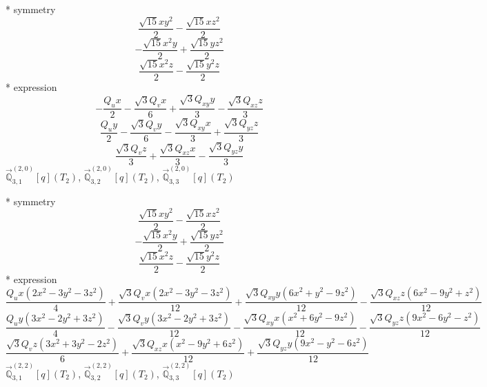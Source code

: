 \documentclass[fleqn,8pt]{jsarticle}
\begin{document}
\noindent\quad ** symmetry
\begin{dmath*}
\frac{\sqrt{15} x y^{2}}{2} - \frac{\sqrt{15} x z^{2}}{2}
\end{dmath*}
\begin{dmath*}
- \frac{\sqrt{15} x^{2} y}{2} + \frac{\sqrt{15} y z^{2}}{2}
\end{dmath*}
\begin{dmath*}
\frac{\sqrt{15} x^{2} z}{2} - \frac{\sqrt{15} y^{2} z}{2}
\end{dmath*}
\noindent\quad ** expression
\begin{dmath*}
- \frac{Q_{u} x}{2} - \frac{\sqrt{3} Q_{v} x}{6} + \frac{\sqrt{3} Q_{xy} y}{3} - \frac{\sqrt{3} Q_{xz} z}{3}
\end{dmath*}
\begin{dmath*}
\frac{Q_{u} y}{2} - \frac{\sqrt{3} Q_{v} y}{6} - \frac{\sqrt{3} Q_{xy} x}{3} + \frac{\sqrt{3} Q_{yz} z}{3}
\end{dmath*}
\begin{dmath*}
\frac{\sqrt{3} Q_{v} z}{3} + \frac{\sqrt{3} Q_{xz} x}{3} - \frac{\sqrt{3} Q_{yz} y}{3}
\end{dmath*}
\noindent\quad $\vec{\mathbb{Q}}_{3,1}^{(2,0)}[q](T_{2})$, $\vec{\mathbb{Q}}_{3,2}^{(2,0)}[q](T_{2})$, $\vec{\mathbb{Q}}_{3,3}^{(2,0)}[q](T_{2})$

\noindent\quad ** symmetry
\begin{dmath*}
\frac{\sqrt{15} x y^{2}}{2} - \frac{\sqrt{15} x z^{2}}{2}
\end{dmath*}
\begin{dmath*}
- \frac{\sqrt{15} x^{2} y}{2} + \frac{\sqrt{15} y z^{2}}{2}
\end{dmath*}
\begin{dmath*}
\frac{\sqrt{15} x^{2} z}{2} - \frac{\sqrt{15} y^{2} z}{2}
\end{dmath*}
\noindent\quad ** expression
\begin{dmath*}
\frac{Q_{u} x \left(2 x^{2} - 3 y^{2} - 3 z^{2}\right)}{4} + \frac{\sqrt{3} Q_{v} x \left(2 x^{2} - 3 y^{2} - 3 z^{2}\right)}{12} + \frac{\sqrt{3} Q_{xy} y \left(6 x^{2} + y^{2} - 9 z^{2}\right)}{12} - \frac{\sqrt{3} Q_{xz} z \left(6 x^{2} - 9 y^{2} + z^{2}\right)}{12}
\end{dmath*}
\begin{dmath*}
\frac{Q_{u} y \left(3 x^{2} - 2 y^{2} + 3 z^{2}\right)}{4} - \frac{\sqrt{3} Q_{v} y \left(3 x^{2} - 2 y^{2} + 3 z^{2}\right)}{12} - \frac{\sqrt{3} Q_{xy} x \left(x^{2} + 6 y^{2} - 9 z^{2}\right)}{12} - \frac{\sqrt{3} Q_{yz} z \left(9 x^{2} - 6 y^{2} - z^{2}\right)}{12}
\end{dmath*}
\begin{dmath*}
\frac{\sqrt{3} Q_{v} z \left(3 x^{2} + 3 y^{2} - 2 z^{2}\right)}{6} + \frac{\sqrt{3} Q_{xz} x \left(x^{2} - 9 y^{2} + 6 z^{2}\right)}{12} + \frac{\sqrt{3} Q_{yz} y \left(9 x^{2} - y^{2} - 6 z^{2}\right)}{12}
\end{dmath*}
\noindent\quad $\vec{\mathbb{Q}}_{3,1}^{(2,2)}[q](T_{2})$, $\vec{\mathbb{Q}}_{3,2}^{(2,2)}[q](T_{2})$, $\vec{\mathbb{Q}}_{3,3}^{(2,2)}[q](T_{2})$
\end{document}
